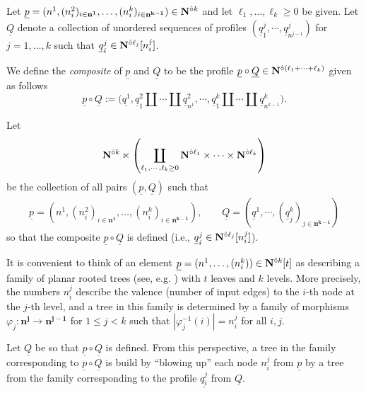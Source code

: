 \begin{definition}
\label{circ-dot-composite}
Let $\underline{p}=(n^1,(n^2_i)_{i\in\mathbf{n^1}},\dots,(n^k_i)_{i\in\mathbf{n^{k-1}}}) \in \mathbf{N}^{\hat{\circ}k}$ and let $\ell_1,\dots,\ell_k\geq 0$ be given. Let $\underline{Q}$ denote a collection of unordered sequences of profiles $(\underline{q}_1^j,\cdots, \underline{q}^j_{n^{j-1}})$ for $j=1,\dots,k$ such that $\underline{q}^j_i\in\mathbf{N}^{\hat{\circ}\ell_j}[n^j_i]$. 

We define the \textit{composite} of $\underline{p}$ and $\underline{Q}$ to be the profile $\underline{p}\circ \underline{Q}\in\mathbf{N}^{\hat{\circ}(\ell_1+\dots+\ell_k)}$ given as follows \[\underline{p}\circ \underline{Q}:=\big(\underline{q^1}, \underline{q}^2_1\amalg \cdots \amalg \underline{q}^2_{n^1}, \cdots, \underline{q}_1^k\amalg \cdots \amalg \underline{q}_{n^{k-1}}^k\big).\]
\end{definition}

Let \[\mathbf{N}^{\hat{\circ}k} \ltimes \left(\coprod_{\ell_1,\cdots,\ell_k\geq 0}\mathbf{N}^{\hat{\circ}\ell_1} \times \cdots \times \mathbf{N}^{\hat{\circ}\ell_k}\right)\] be the collection of all pairs $(\underline{p}, \underline{Q})$ such that 
\begin{align*} 
\underline{p}=(n^1,(n^2_i)_{i\in\mathbf{n^1}},\dots,(n^k_i)_{i\in\mathbf{n^{k-1}}}), \quad \quad
\underline{Q}=(\underline{q}^1,\cdots ,(\underline{q}^k_j)_{j\in \mathbf{n^{k-1}}})
\end{align*}
so that the composite $\underline{p} \circ \underline{Q}$ is defined (i.e., $\underline{q}^j_i\in \mathbf{N}^{\hat{\circ}\ell_j}[n^j_i]$).  

\begin{remark} \label{rem:trees-n-stuff}
    It is convenient to think of an element $\underline{p}=(n^1,\dots,(n^k_i))\in \mathbf{N}^{\hat{\circ}k}[t]$ as describing a family of planar rooted trees (see, e.g. \cite{Ching-thesis}) with $t$ leaves and $k$ levels. More precisely, the numbers $n^j_i$ describe the valence (number of input edges) to the $i$-th node at the $j$-th level, and a tree in this family is determined by a family of morphisms $\varphi_j \colon \mathbf{n^j}\to\mathbf{n^{j-1}}$ for $1\leq j < k$ such that $|\varphi_j^{-1}(i)|=n_i^j$ for all $i,j$. %
    
    Let $\underline{Q}$ be so that $\underline{p}\circ \underline{Q}$ is defined. From this perspective, a tree in the family corresponding to $\underline{p}\circ\underline{Q}$ is build by ``blowing up'' each node $n^j_i$ from $\underline{p}$ by a tree from the family corresponding to the profile $\underline{q^j_i}$ from $\underline{Q}$.
\end{remark}

